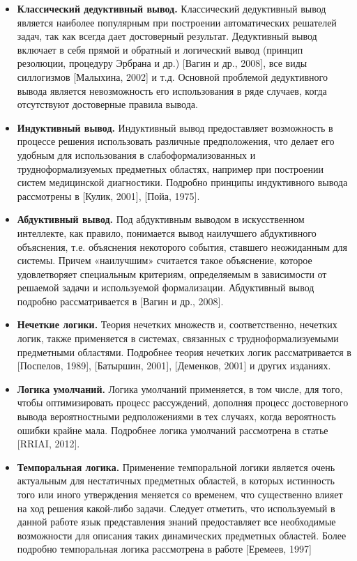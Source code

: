 \begin{itemize}
	\item{\textbf{Классический дедуктивный вывод.} Классический дедуктивный вывод является наиболее популярным при построении автоматических решателей задач, так как всегда дает достоверный результат. Дедуктивный вывод включает в себя прямой и обратный и логический вывод (принцип резолюции, процедуру Эрбрана и др.) [Вагин и др., 2008], все виды силлогизмов [Малыхина, 2002] и т.д. Основной проблемой
	дедуктивного вывода является невозможность его использования в ряде случаев, когда отсутствуют
	достоверные правила вывода.}
	\item{\textbf{Индуктивный вывод.} Индуктивный вывод предоставляет возможность в процессе решения использовать различные предположения, что делает его удобным для использования в слабоформализованных и
	трудноформализуемых предметных областях, например при построении систем медицинской диагностики. Подробно принципы индуктивного вывода рассмотрены в [Кулик, 2001], [Пойа, 1975].}
	\item{\textbf{Абдуктивный вывод.} Под абдуктивным выводом в искусственном интеллекте, как правило, понимается вывод наилучшего абдуктивного объяснения, т.е. объяснения некоторого события, ставшего
	неожиданным для системы. Причем «наилучшим»	считается такое объяснение, которое удовлетворяет специальным критериям, определяемым в зависимости от решаемой задачи и используемой	формализации. Абдуктивный вывод подробно рассматривается в [Вагин и др., 2008].}
	\item{\textbf{Нечеткие логики.} Теория нечетких множеств и, соответственно, нечетких логик, также применяется в системах, связанных с трудноформализуемыми предметными областями. Подробнее теория нечетких логик рассматривается в [Поспелов, 1989], [Батыршин, 2001], [Деменков, 2001] и других изданиях.}
	\item{\textbf{Логика умолчаний.} Логика умолчаний применяется, в том числе, для того, чтобы оптимизировать процесс рассуждений,	дополняя процесс достоверного вывода вероятностными  редположениями в тех случаях, когда вероятность ошибки крайне мала. Подробнее логика умолчаний рассмотрена в статье [RRIAI, 2012].}
	\item{\textbf{Темпоральная логика.} Применение темпоральной логики является очень актуальным для нестатичных предметных областей, в которых истинность того или иного утверждения меняется со временем, что существенно влияет на ход решения какой-либо задачи. Следует отметить, что используемый в 		данной работе язык представления знаний предоставляет все необходимые возможности для описания таких динамических предметных областей. Более подробно темпоральная логика рассмотрена в работе [Еремеев, 1997]}
\end{itemize}

